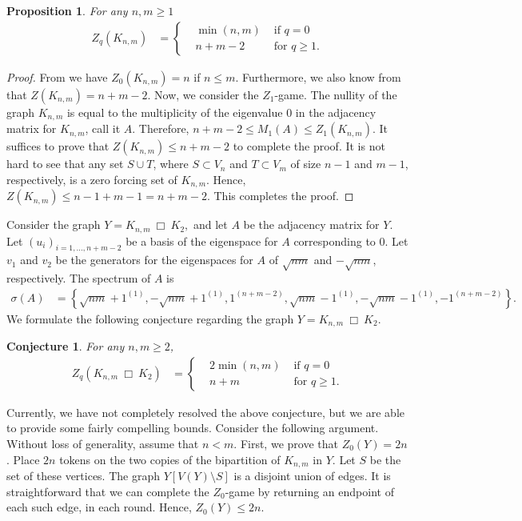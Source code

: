 \documentclass[3p,times,12pt]{article}
\newtheorem{prop}[theorem]{Proposition}
\newtheorem{conj}[theorem]{Conjecture}
\newcommand{\sqr}{\: \Box\:  }
\begin{document}
	\begin{prop}
		For any $n,m\geq 1$
		\begin{align*}
			Z_q(K_{n,m}) &= 
			\left\{ 
			\begin{aligned}
			&\min(n,m)  &\mbox{ if } q = 0\\
			&n+m-2 &\mbox{ for } q\geq 1.
			\end{aligned}
			\right. 
		\end{align*}
		
	\end{prop}
	\begin{proof}
	From \cite[Prop. 3.4]{peters} we have  $Z_0(K_{n,m}) = n$ if $n \leq m$. Furthermore, we also know from \cite{AIM} that $Z(K_{n,m})=n+m-2$.
Now, we consider the $Z_1$-game. The nullity of the graph $K_{n,m}$ is equal to the multiplicity of the eigenvalue $0$ in the adjacency matrix for $K_{n,m}$, call it $A$. Therefore, $n+m-2 \leq M_1(A) \leq Z_1(K_{n,m})$. It suffices to prove that $Z(K_{n,m}) \leq n+m-2$ to complete the proof. It is not hard to see that any set $S\cup T$, where $S\subset V_n$ and $T \subset V_m$ of size $n-1$ and $m-1$, respectively, is a zero forcing set of $K_{n,m}$. Hence, $Z(K_{n,m}) \leq n-1 +m-1 = n+m- 2$. This completes the proof.
	\end{proof}
	
	Consider the graph $Y = K_{n,m} \sqr K_2,$ and let $A$ be the adjacency matrix for $Y$.
	Let $(u_i)_{i=1,\ldots,n+m-2}$ be a basis of the eigenspace for $A$ corresponding to $0$. Let $v_1$ and $v_2$ be the generators for the eigenspaces  for $A$ of $\sqrt{nm}$ and $-\sqrt{nm}$, respectively. 	The spectrum of $A$ is
	\begin{align*}
	\sigma(A) &= \left\{ \sqrt{nm}+1^{(1)}, -\sqrt{nm}+1^{(1)}, 1^{(n+m-2)},\sqrt{nm}-1^{(1)}, -\sqrt{nm}-1^{(1)}, -1^{(n+m-2)} \right\}.
	\end{align*}
	We formulate the following conjecture regarding the graph $Y=K_{n,m} \sqr K_2$.
	\begin{conj}
		For any $n,m\geq 2$,
		\begin{align*}
			Z_q(K_{n,m} \sqr K_2) &= 
			\left\{ 
				\begin{aligned}
					&2\min(n,m)  &\mbox{ if } q = 0\\
					&n+m &\mbox{ for } q\geq 1.
				\end{aligned}
			\right. 
		\end{align*}
	\end{conj}
Currently, we have not completely resolved the above conjecture, but we are able to provide some fairly compelling bounds. Consider the following argument.
	Without loss of generality, assume that $n<m$. First, we prove that $Z_0(Y) = 2n$. Place $2n$ tokens on the two copies of the bipartition of $K_{n,m}$ in $Y$. Let $S$ be the set of these vertices. The graph $Y[V(Y)\setminus S]$ is a disjoint union of edges. It is straightforward that we can complete the $Z_0$-game by returning an endpoint of each such edge, in each round. Hence, $Z_0(Y) \leq 2n$.
\end{document}

